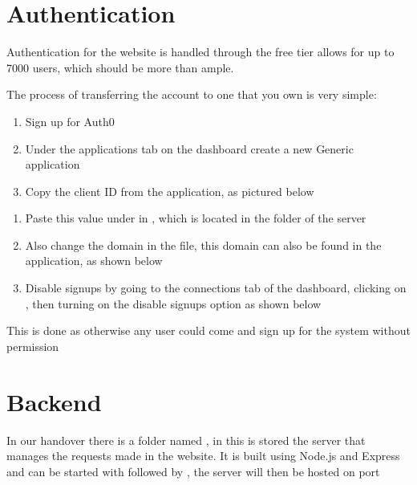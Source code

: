 \documentclass[letterpaper,10pt,english]{sphinxmanual}
\let\sphinxpxdimen\pdfpxdimen\else\newdimen\sphinxpxdimen
\begin{document}
\section{Authentication}
\label{\detokenize{docs/Installation/authentication:authentication}}\label{\detokenize{docs/Installation/authentication::doc}}
Authentication for the website is handled through
 the free tier allows for up to 7000
users, which should be more than ample.

The process of transferring the account to one that you own is very
simple:
\begin{enumerate}
%
\item {} 
Sign up for Auth0 

\item {} 
Under the applications tab on the dashboard create a new Generic
application

\item {} 
Copy the client ID from the application, as pictured below

\end{enumerate}

\noindent\sphinxincludegraphics[width=300\sphinxpxdimen]{{auth0}.png}
\begin{enumerate}
%
\setcounter{enumi}{3}
\item {} 
Paste this value under  in , which is
located in the  folder of the  server

\item {} 
Also change the domain in the  file, this domain
can also be found in the application, as shown below

\item {} 
Disable signups by going to the connections tab of the dashboard,
clicking on , then turning on the
disable signups option as shown below

\end{enumerate}

This is done as otherwise any user could come and sign up for the system
without permission


\section{Backend}
\label{\detokenize{docs/Installation/backEnd:backend}}\label{\detokenize{docs/Installation/backEnd::doc}}
In our handover there is a folder named , in this is stored
the server that manages the requests made in the website. It is built
using Node.js and Express and can be started with 
followed by , the server will then be hosted on port
\end{document}
